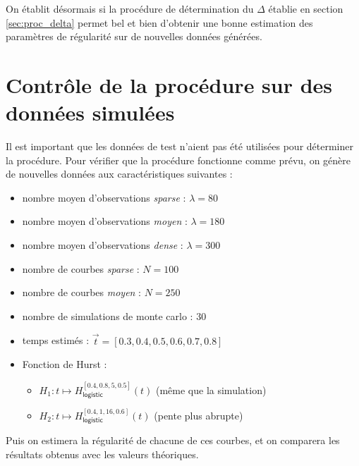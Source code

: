 On établit désormais si la procédure de détermination du $\Delta$ établie en section \ref{sec:proc_delta} permet bel et bien d'obtenir une bonne estimation des paramètres de régularité sur de nouvelles données générées.

\section{Contrôle de la procédure sur des données simulées}

Il est important que les données de test n'aient pas été utilisées pour déterminer la procédure. Pour vérifier que la procédure fonctionne comme prévu, on génère de nouvelles données aux caractéristiques suivantes : 

\begin{itemize}
\item nombre moyen d'observations \emph{sparse} : $\lambda = 80$
\item nombre moyen d'observations \emph{moyen} : $\lambda = 180$
\item nombre moyen d'observations \emph{dense}  : $\lambda = 300$
\end{itemize}

\begin{itemize}
\item nombre de courbes \emph{sparse} : $N = 100$
\item nombre de courbes \emph{moyen} : $N=250$
\end{itemize}

\begin{itemize}
\item nombre de simulations de monte carlo : 30
\item temps estimés : $\vec t = [0.3, 0.4, 0.5, 0.6, 0.7, 0.8]$
\item Fonction de Hurst :


\noindent\begin{itemize}
    \item $H_1 : t \mapsto H^{[0.4, 0.8, 5, 0.5]}_{\textsf{logistic}}(t)$ (même que la simulation)
    \item $H_2 : t \mapsto H^{[0.4, 1, 16, 0.6]}_{\textsf{logistic}}(t)$ (pente plus abrupte)
  \end{itemize}
\end{itemize}

\noindent  Puis on estimera la régularité de chacune de ces courbes, et on comparera les résultats obtenus avec les valeurs théoriques.

